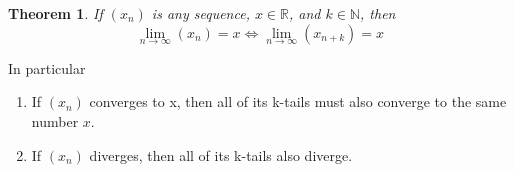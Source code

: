 \documentclass{article}
\newtheorem{theorem}{Theorem}[section]
\newtheorem{one minute paper}[theorem]{One Minute Paper}
\begin{document}
\begin{theorem}
    If $(x_n)$ is any sequence, $x \in \mathbb{R}$, and $k \in \mathbb{N}$, then 
    \begin{equation}
        \lim_{n\rightarrow\infty}(x_n) = x \iff \lim_{n\rightarrow\infty}(x_{n+k}) = x
    \end{equation}
\end{theorem}

In particular
\begin{enumerate}
    \item If $(x_n)$ converges to x, then all of its k-tails must also converge to the same number $x$. 
    \item If $(x_n)$ diverges, then all of its k-tails also diverge. 
\end{enumerate}
\end{document}

